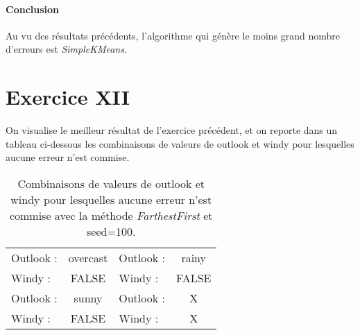 \documentclass[a4paper, 11pt]{report}
\begin{document}
	\paragraph{Conclusion}Au vu des résultats précédents, l'algorithme qui génère le moins grand nombre d'erreurs est \emph{SimpleKMeans}.

	\section{Exercice XII}
	On visualise le meilleur résultat de l'exercice précédent, et on reporte dans un tableau ci-dessous les combinaisons de valeurs de outlook et windy pour lesquelles aucune erreur n'est commise.

	\begin{table}[h!]
		\centering
		\begin{tabular}{|l|c|l|c|}
			\hline
			Outlook : & overcast  & Outlook : & rainy \\
			Windy : & FALSE & Windy : & FALSE \\
			\hline
			Outlook : & sunny & Outlook : & X \\
			Windy : & FALSE & Windy : & X \\
			\hline
		\end{tabular}
		\caption{Combinaisons de valeurs de outlook et windy pour lesquelles aucune erreur n'est commise avec la méthode \emph{FarthestFirst} et seed=100.}
		\label{tab:exo12}
	\end{table}
\end{document}
